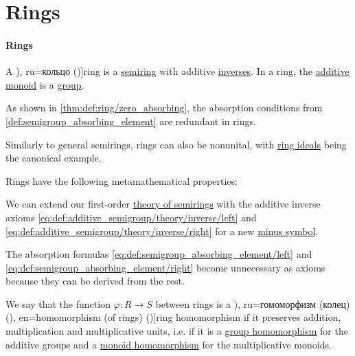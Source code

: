 \section{Rings}\label{sec:rings}

\paragraph{Rings}

\begin{definition}\label{def:ring}
  A \term[bg=пръстен (\cite[def. V.1]{ГеновМиховскиМоллов1991Алгебра}), ru=кольцо (\cite[def. 1.3.1]{Винберг2014КурсАлгебры})]{ring} is a \hyperref[def:semiring]{semiring} with additive \hyperref[def:monoid_inverse]{inverses}. In a ring, the \hyperref[def:semiring/monoids]{additive monoid} is a \hyperref[def:group]{group}.

  As shown in \cref{thm:def:ring/zero_absorbing}, the absorption conditions from \cref{def:semigroup_absorbing_element} are redundant in rings.

  Similarly to general semirings, rings can also be nonunital, with \hyperref[def:semiring_ideal]{ring ideals} being the canonical example.

  Rings have the following metamathematical properties:
  \begin{thmenum}
    \mimprovised We can extend our first-order \hyperref[def:semiring/theory]{theory of semirings} with the additive inverse axioms \eqref{eq:def:additive_semigroup/theory/inverse/left} and \eqref{eq:def:additive_semigroup/theory/inverse/right} for a new \hyperref[def:additive_semigroup/signature/minus]{minus symbol}.

    The absorption formulas \eqref{eq:def:semigroup_absorbing_element/left} and \eqref{eq:def:semigroup_absorbing_element/right} become unnecessary as axioms because they can be derived from the rest.

    \mimprovised We say that the function \( \varphi: R \to S \) between rings is a \term[bg=хомоморфизм (на пръстени) (\cite[122]{ГеновМиховскиМоллов1991Алгебра}), ru=гомоморфизм (колец) (\cite[156]{Кострикин2020АлгебраЧасть1}), en=homomorphism (of rings) (\cite[def. 2.3]{Jacobson1985BasicAlgebraI})]{ring homomorphism} if it preserves addition, multiplication and multiplicative units, i.e. if it is a \hyperref[def:group/morphism]{group homomorphism} for the additive groups and a \hyperref[def:monoid/morphism]{monoid homomorphism} for the multiplicative monoids.


\end{thmenum}
\end{definition}
